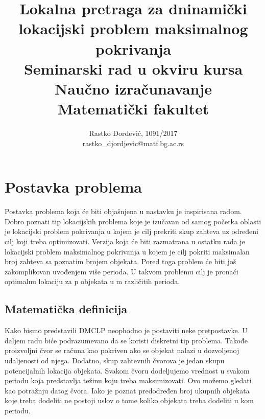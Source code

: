 \documentclass[a4paper]{article}
\begin{document}
\title{Lokalna pretraga za dninamički lokacijski problem maksimalnog pokrivanja\\ \small{Seminarski rad u okviru kursa\\Naučno izračunavanje\\ Matematički fakultet}}

\author{Rastko Đorđević, 1091/2017\\ rastko\_djordjevic@matf.bg.ac.rs}
\maketitle


\tableofcontents

\newpage



\section{Postavka problema}

Postavka problema koja će biti objašnjena u nastavku je inspirisana radom\cite{main_paper}. Dobro poznati tip lokacijskih problema koje je izučavan od samog početka oblasti je lokacijski problem pokrivanja u kojem je cilj prekriti skup zahteva uz određeni cilj koji treba optimizovati. Verzija koja će biti razmatrana u ostatku rada je lokacijski problem maksimalnog pokrivanja u kojem je cilj pokriti maksimalan broj zahteva sa poznatim brojem objekata. Pored toga problem će biti još zakomplikovan uvođenjem više perioda.  U takvom problemu cilj je pronaći optimalnu lokaciju za p objekata u m različitih perioda.

\subsection{Matematička definicija}

Kako bismo predstavili DMCLP neophodno je postaviti neke pretpostavke. U daljem radu biće podrazumevano da se koristi diskretni tip problema. Takođe proizvoljni čvor se računa kao pokriven ako se objekat nalazi u dozvoljenoj udaljenosti od njega. Dodatno, skup zahtevnih čvorova je jedan skupu potencijalnih lokacija objekata. Svakom čvoru dodeljujemo vrednost u svakom periodu koja predstavlja težinu koju treba maksimizovati. Ovo možemo gledati kao potražnju datog čvora. Iako je poznat predodređen broj ukupnih objekata koje treba dodeliti ne postoji uslov o tome koliko objekata treba dodeliti u kom periodu.
\end{document}
